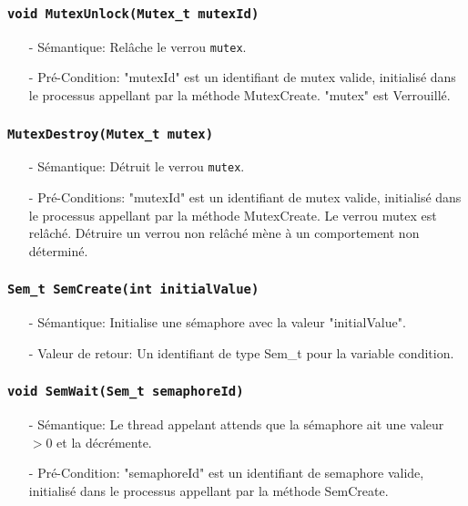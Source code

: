 \documentclass[11pt]{article}
\begin{document}
\subsubsection{\texttt{void MutexUnlock(Mutex\_t mutexId)}}
\begin{itemize}
\item[-]Sémantique: Relâche le verrou \texttt{mutex}.
\item[-]Pré-Condition: "mutexId" est un identifiant de mutex valide, initialisé dans le processus
  appellant par la méthode MutexCreate. "mutex" est Verrouillé.
\end{itemize}

\subsubsection{\texttt{MutexDestroy(Mutex\_t mutex)}}
\begin{itemize}
\item[-]Sémantique: Détruit le verrou \texttt{mutex}.
\item[-]Pré-Conditions: "mutexId" est un identifiant de mutex valide, initialisé dans le processus
  appellant par la méthode MutexCreate.
  Le verrou mutex est relâché. Détruire un verrou non relâché mène à un comportement
  non déterminé.
\end{itemize}

\subsubsection{\texttt{Sem\_t SemCreate(int initialValue)}}
\begin{itemize}
\item[-]Sémantique: Initialise une sémaphore avec la valeur "initialValue".
\item[-]Valeur de retour: Un identifiant de type Sem\_t pour la variable condition.
\end{itemize}

\subsubsection{\texttt{void SemWait(Sem\_t semaphoreId)}}
\begin{itemize}
\item[-]Sémantique: Le thread appelant attends que la sémaphore ait une valeur $>0$ et la décrémente. 
\item[-]Pré-Condition: "semaphoreId" est un identifiant de semaphore valide, initialisé dans le processus
  appellant par la méthode SemCreate.
\end{itemize}
\end{document}
